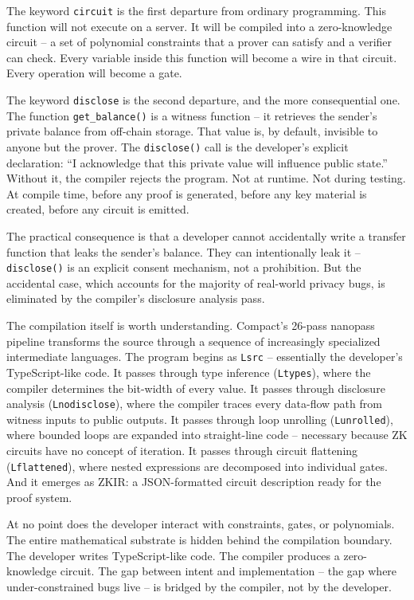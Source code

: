 \documentclass[
  11pt,
  openany]{report}
\begin{document}
The keyword \texttt{circuit} is the first departure from ordinary programming.
This function will not execute on a server. It will be compiled into a
zero-knowledge circuit -- a set of polynomial constraints that a prover can
satisfy and a verifier can check. Every variable inside this function will
become a wire in that circuit. Every operation will become a gate.

The keyword \texttt{disclose} is the second departure, and the more
consequential one. The function \texttt{get\_balance()} is a witness function --
it retrieves the sender's private balance from off-chain storage. That value is,
by default, invisible to anyone but the prover. The \texttt{disclose()} call is
the developer's explicit declaration: ``I acknowledge that this private value
will influence public state.'' Without it, the compiler rejects the program. Not
at runtime. Not during testing. At compile time, before any proof is generated,
before any key material is created, before any circuit is emitted.

The practical consequence is that a developer cannot accidentally write a
transfer function that leaks the sender's balance. They can intentionally leak
it -- \texttt{disclose()} is an explicit consent mechanism, not a prohibition.
But the accidental case, which accounts for the majority of real-world privacy
bugs, is eliminated by the compiler's disclosure analysis pass.

The compilation itself is worth understanding. Compact's 26-pass nanopass
pipeline transforms the source through a sequence of increasingly specialized
intermediate languages. The program begins as \texttt{Lsrc} -- essentially the
developer's TypeScript-like code. It passes through type inference
(\texttt{Ltypes}), where the compiler determines the bit-width of every value.
It passes through disclosure analysis (\texttt{Lnodisclose}), where the compiler
traces every data-flow path from witness inputs to public outputs. It passes
through loop unrolling (\texttt{Lunrolled}), where bounded loops are expanded
into straight-line code -- necessary because ZK circuits have no concept of
iteration. It passes through circuit flattening (\texttt{Lflattened}), where
nested expressions are decomposed into individual gates. And it emerges as ZKIR:
a JSON-formatted circuit description ready for the proof system.

At no point does the developer interact with constraints, gates, or polynomials.
The entire mathematical substrate is hidden behind the compilation boundary. The
developer writes TypeScript-like code. The compiler produces a zero-knowledge
circuit. The gap between intent and implementation -- the gap where
under-constrained bugs live -- is bridged by the compiler, not by the developer.
\end{document}
